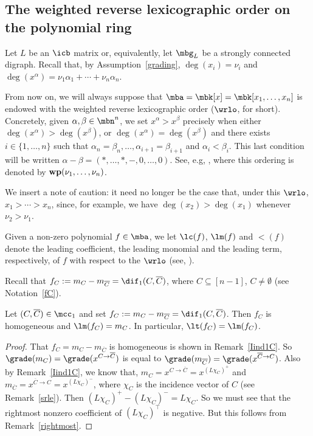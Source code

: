 \subsection{The weighted reverse lexicographic order on the polynomial 
ring}

 Let $L$ be an $\icb$ matrix or, equivalently, let $\mbg_L$
be a strongly connected digraph. Recall that, by
Assumption~\ref{grading}, $\deg(x_i)=\nu_i$ and
$\deg(x^\alpha)=\nu_1\alpha_1+\cdots +\nu_n\alpha_n$.

\begin{assumption}\label{wrlo}
From now on, we will always suppose that $\mba=\mbk[x]=\mbk[x_1,\ldots
  ,x_n]$ is endowed with the weighted reverse lexicographic order
($\wrlo$, for short). Concretely, given $\alpha,\beta\in\mbn^{n}$, we
set $x^\alpha>x^\beta$ precisely when either
$\deg(x^\alpha)>\deg(x^\beta)$, or $\deg(x^\alpha)=\deg(x^\beta)$ and
there exists $i\in\{1,\ldots ,n\}$ such that $\alpha_n=\beta_n,\ldots
,\alpha_{i+1}=\beta_{i+1}$ and $\alpha_i<\beta_i$. This last
condition will be written $\alpha-\beta=(*,\ldots,*,-,0,\ldots
,0)$. See, e.g, \cite[p.~13]{gp}, where this ordering is denoted by
${\bf wp}(\nu_1,\ldots ,\nu_n)$.
\end{assumption}

We insert a note of caution: it need no longer be the case that, under
this $\wrlo$, $x_1>\cdots >x_n$, since, for example, we have
$\deg(x_2)>\deg(x_1)$ whenever $\nu_2>\nu_1$.

Given a non-zero polynomial $f\in \mba$, we let $\lc(f)$, $\lm(f)$
and $\lt(f)$ denote the leading coefficient, the leading monomial
and the leading term, respectively, of $f$ with respect to the
$\wrlo$ (see, \eg \cite[\S~2.2,~Definition~7]{clo}).

Recall that $f_C:=m_C-m_{\overline{C}}=\dif_1(C,\overline{C})$, where
$C\subseteq [n-1]$, $C\neq\emptyset$ (see Notation~\ref{fC}).

\begin{lemma}\label{lm}
Let $(C,\overline{C})\in\mcc_1$ and set
$f_C:=m_C-m_{\overline{C}}=\dif_1(C,\overline{C})$. Then $f_C$ is
homogeneous and $\lm(f_C)=m_C$. In particular, $\lt(f_C)=\lm(f_C)$.
\end{lemma}
\begin{proof}
That $f_C=m_C-m_{\overline{C}}$ is homogeneous is shown in
Remark~\ref{Iind1C}. So $\grade(m_C)=\grade(x^{C\to\overline{C}})$ is
equal to $\grade(m_{\overline{C}})=\grade(x^{\overline{C}\to
  C})$. Also by Remark~\ref{Iind1C}, we know that,
$m_C=x^{C\to\overline{C}}=x^{(L\chi_C)^+}$ and
$m_{\overline{C}}=x^{\overline{C}\to C}=x^{(L\chi_C)^-}$, where
$\chi_C$ is the incidence vector of $C$ (see Remark~\ref{srle}). Then
$(L\chi_C)^+-(L\chi_C)^-=L\chi_C$. So we must see that the rightmost
nonzero coefficient of $(L\chi_C)^{\top}$ is negative. But this
follows from Remark~\ref{rightmost}.
\end{proof}

